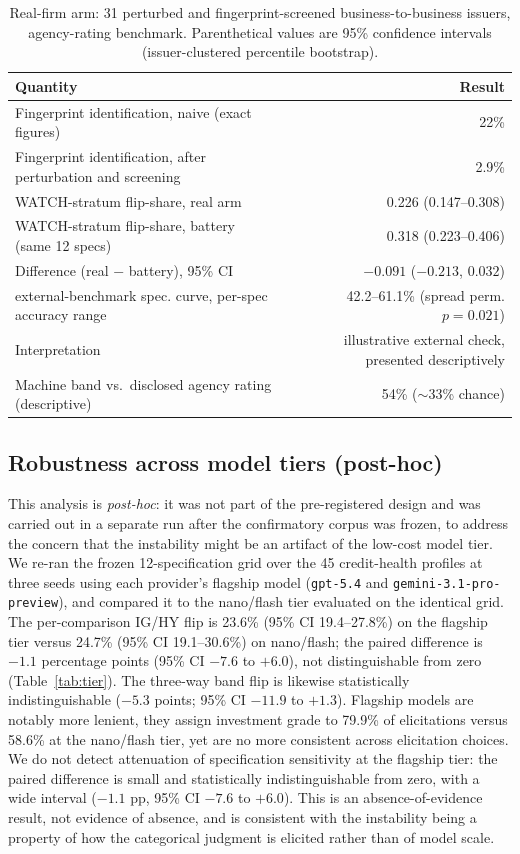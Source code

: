 \documentclass[a4paper,fleqn]{cas-sc}
\begin{document}
\begin{table}[t]\centering
\caption{Real-firm arm: 31 perturbed and fingerprint-screened business-to-business issuers, agency-rating benchmark.
Parenthetical values are 95\% confidence intervals (issuer-clustered percentile bootstrap).}
\label{tab:realarm}
\begin{tabular}{lr}\toprule
Quantity & Result \\\midrule
Fingerprint identification, naive (exact figures) & 22\% \\
Fingerprint identification, after perturbation and screening & 2.9\% \\
WATCH-stratum flip-share, real arm & 0.226 (0.147--0.308) \\
WATCH-stratum flip-share, battery (same 12 specs) & 0.318 (0.223--0.406) \\
Difference (real $-$ battery), 95\% CI & $-0.091$ ($-0.213$, $0.032$) \\
external-benchmark spec. curve, per-spec accuracy range & 42.2--61.1\% (spread perm. $p=0.021$) \\
Interpretation & illustrative external check, presented descriptively \\
Machine band vs.\ disclosed agency rating (descriptive) & 54\% ($\sim$33\% chance) \\\bottomrule
\end{tabular}\end{table}

\subsection{Robustness across model tiers (post-hoc)}\label{sec:tier}
This analysis is \emph{post-hoc}: it was not part of the pre-registered design and was carried out in a
separate run after the confirmatory corpus was frozen, to address the
concern that the instability might be an artifact of the low-cost model tier. We re-ran the frozen
12-specification grid over the 45 credit-health profiles at three seeds using each provider's flagship
model (\texttt{gpt-5.4} and \texttt{gemini-3.1-pro-preview}), and compared it to the nano/flash tier
evaluated on the identical grid. The per-comparison IG/HY flip is 23.6\%
(95\% CI 19.4--27.8\%) on the flagship tier versus 24.7\% (95\% CI 19.1--30.6\%) on nano/flash; the
paired difference is $-1.1$ percentage points (95\% CI $-7.6$ to $+6.0$), not distinguishable from zero
(Table~\ref{tab:tier}). The three-way band flip is likewise statistically indistinguishable
($-5.3$ points; 95\% CI $-11.9$ to $+1.3$). Flagship models are notably more lenient, they assign
investment grade to 79.9\% of elicitations versus 58.6\% at the nano/flash tier, yet are no more
consistent across elicitation choices. We do not detect attenuation of specification sensitivity at the
flagship tier: the paired difference is small and statistically indistinguishable from zero, with a wide
interval ($-1.1$ pp, 95\% CI $-7.6$ to $+6.0$). This is an absence-of-evidence result, not evidence of
absence, and is consistent with the instability being a property of how the categorical judgment is
elicited rather than of model scale.
\end{document}
